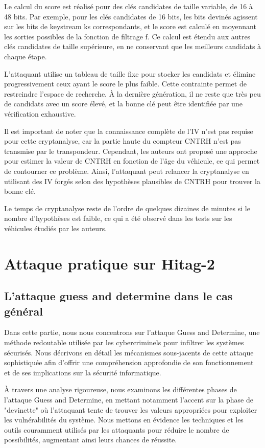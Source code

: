 \documentclass{template}
\begin{document}
Le calcul du score est réalisé pour des clés candidates de taille variable, de 16 à 48 bits. Par exemple, pour les clés candidates de 16 bits, les bits devinés agissent sur les bits de keystream ks correspondants, et le score est calculé en moyennant les sorties possibles de la fonction de filtrage f. Ce calcul est étendu aux autres clés candidates de taille supérieure, en ne conservant que les meilleurs candidats à chaque étape.

L'attaquant utilise un tableau de taille fixe pour stocker les candidats et élimine progressivement ceux ayant le score le plus faible. Cette contrainte permet de restreindre l'espace de recherche. À la dernière génération, il ne reste que très peu de candidats avec un score élevé, et la bonne clé peut être identifiée par une vérification exhaustive.

Il est important de noter que la connaissance complète de l'IV n'est pas requise pour cette cryptanalyse, car la partie haute du compteur CNTRH n'est pas transmise par le transpondeur. Cependant, les auteurs ont proposé une approche pour estimer la valeur de CNTRH en fonction de l'âge du véhicule, ce qui permet de contourner ce problème. Ainsi, l'attaquant peut relancer la cryptanalyse en utilisant des IV forgés selon des hypothèses plausibles de CNTRH pour trouver la bonne clé.

Le temps de cryptanalyse reste de l'ordre de quelques dizaines de minutes si le nombre d'hypothèses est faible, ce qui a été observé dans les tests sur les véhicules étudiés par les auteurs.


\chapter{Attaque pratique sur Hitag-2}
\section{L'attaque guess and determine dans le cas général}
\baselineskip=16pt
Dans cette partie, nous nous concentrons sur l'attaque Guess and Determine, une méthode redoutable utilisée par les cybercriminels pour infiltrer les systèmes sécurisés. Nous décrivons en détail les mécanismes sous-jacents de cette attaque sophistiquée afin d'offrir une compréhension approfondie de son fonctionnement et de ses implications sur la sécurité informatique.


À travers une analyse rigoureuse, nous examinons les différentes phases de l'attaque Guess and Determine, en mettant notamment l'accent sur la phase de "devinette" où l'attaquant tente de trouver les valeurs appropriées pour exploiter les vulnérabilités du système. Nous mettons en évidence les techniques et les outils couramment utilisés par les attaquants pour réduire le nombre de possibilités, augmentant ainsi leurs chances de réussite.
\end{document}
